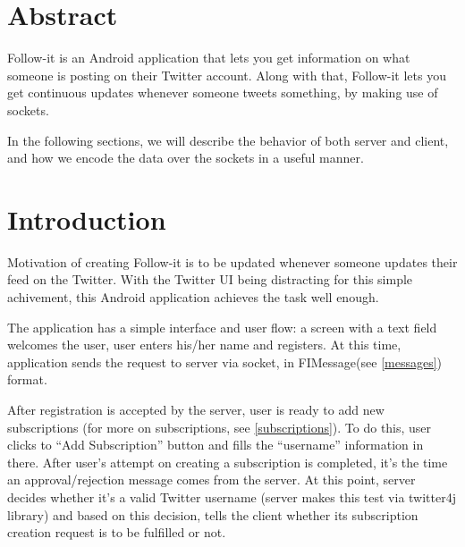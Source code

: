 \documentclass{article}
\begin{document}

\maketitle

\tableofcontents

\newpage

\section{Abstract}
Follow-it is an Android application that lets you get information on what someone is posting on their Twitter account. Along with that, Follow-it lets you get continuous updates whenever someone tweets something, by making use of sockets.

In the following sections, we will describe the behavior of both server and client, and how we encode the data over the sockets in a useful manner.

\section{Introduction}
\par Motivation of creating Follow-it is to be updated whenever someone updates their feed on the Twitter. With the Twitter UI being distracting for this simple achivement, this Android application achieves the task well enough.

\par The application has a simple interface and user flow: a screen with a text field welcomes the user, user enters his/her name and registers. At this time, application sends the request to server via socket, in FIMessage(see \ref{messages}) format.

\par After registration is accepted by the server, user is ready to add new subscriptions (for more on subscriptions, see \ref{subscriptions}). To do this, user clicks to ``Add Subscription'' button and fills the ``username'' information in there. After user's attempt on creating a subscription is completed, it's the time an approval/rejection message comes from the server. At this point, server decides whether it's a valid Twitter username (server makes this test via twitter4j\cite{twitter4j} library) and based on this decision, tells the client whether its subscription creation request is to be fulfilled or not.
\end{document}
